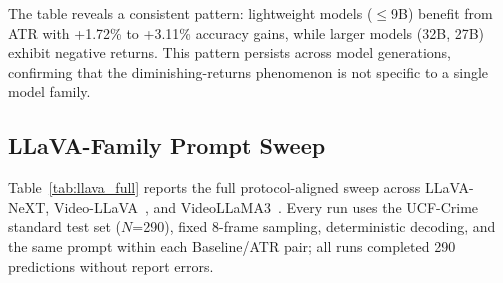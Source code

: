 \documentclass[letterpaper]{article}
\begin{document}
The table reveals a consistent pattern: lightweight models ($\leq$9B) benefit from ATR with +1.72\% to +3.11\% accuracy gains, while larger models (32B, 27B) exhibit negative returns. This pattern persists across model generations, confirming that the diminishing-returns phenomenon is not specific to a single model family.

\subsection{LLaVA-Family Prompt Sweep}
\label{sec:appendix_llava}

Table~\ref{tab:llava_full} reports the full protocol-aligned sweep across LLaVA-NeXT, Video-LLaVA~\cite{lin2024video}, and VideoLLaMA3~\cite{zhang2025videollama3}. Every run uses the UCF-Crime standard test set ($N$=290), fixed 8-frame sampling, deterministic decoding, and the same prompt within each Baseline/ATR pair; all runs completed 290 predictions without report errors.
\end{document}
